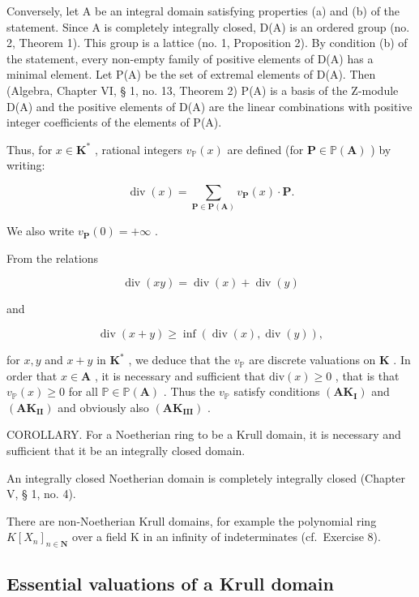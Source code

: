 Conversely, let A be an integral domain satisfying properties (a) and (b) of the statement. Since A is completely integrally closed, D(A) is an ordered group (no. 2, Theorem 1). This group is a lattice (no. 1, Proposition 2). By condition (b) of the statement, every non-empty family of positive elements of D(A) has a minimal element. Let P(A) be the set of extremal elements of D(A). Then (Algebra, Chapter VI, § 1, no. 13, Theorem 2) P(A) is a basis of the Z-module D(A) and the positive elements of D(A) are the linear combinations with positive integer coefficients of the elements of P(A).
 
Thus, for \(x \in \mathbf{K}^*\) , rational integers \(v_{\mathbb{P}}(x)\) are defined (for \(\mathbf{P} \in \mathbb{P}(\mathbf{A})\) ) by writing:

\[
\operatorname{div} (x) = \sum_ {\mathbf {P} \in \mathbf {P} (\mathbf {A})} v _ {\mathbf {P}} (x) \cdot \mathbf {P}.\tag{4}
\]

We also write \(v_{\mathbf{P}}(0) = +\infty\) .

From the relations

\[
\operatorname{div} (x y) = \operatorname{div} (x) + \operatorname{div} (y)
\]

and

\[
\operatorname{div} (x + y) \geqslant \inf (\operatorname{div} (x), \operatorname{div} (y)),
\]

for \(x, y\) and \(x + y\) in \(\mathbf{K}^*\) , we deduce that the \(v_{\mathbb{P}}\) are discrete valuations on \(\mathbf{K}\) . In order that \(x \in \mathbf{A}\) , it is necessary and sufficient that \(\mathrm{div}(x) \geqslant 0\) , that is that \(v_{\mathbb{P}}(x) \geqslant 0\) for all \(\mathbb{P} \in \mathbb{P}(\mathbf{A})\) . Thus the \(v_{\mathbb{P}}\) satisfy conditions \((\mathbf{AK}_{\mathbf{I}})\) and \((\mathbf{AK}_{\mathbf{II}})\) and obviously also \((\mathbf{AK}_{\mathbf{III}})\) .

COROLLARY. For a Noetherian ring to be a Krull domain, it is necessary and sufficient that it be an integrally closed domain.

An integrally closed Noetherian domain is completely integrally closed (Chapter V, § 1, no. 4).

There are non-Noetherian Krull domains, for example the polynomial ring \(K[X_{n}]_{n\in\mathbf{N}}\) over a field K in an infinity of indeterminates (cf.~Exercise 8).

\subsection{Essential valuations of a Krull domain}

